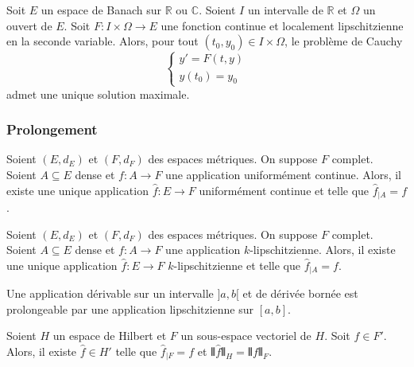 
  \begin{application}
    Soit $E$ un espace de Banach sur $\mathbb{R}$ ou $\mathbb{C}$. Soient $I$ un intervalle de $\mathbb{R}$ et $\Omega$ un ouvert de $E$. Soit $F : I \times \Omega \rightarrow E$ une fonction continue et localement lipschitzienne en la seconde variable. Alors, pour tout $(t_0, y_0) \in I \times \Omega$, le problème de Cauchy
    \[ \begin{cases} y'=F(t,y) \\ y(t_0) = y_0 \end{cases} \tag{$C$} \]
    admet une unique solution maximale.
  \end{application}

  \subsubsection{Prolongement}


  \begin{theorem}
    Soient $(E,d_E)$ et $(F,d_F)$ des espaces métriques. On suppose $F$ complet. Soient $A \subseteq E$ dense et $f : A \rightarrow F$ une application uniformément continue. Alors, il existe une unique application $\widehat{f} : E \rightarrow F$ uniformément continue et telle que $\widehat{f}_{|A} = f$.
  \end{theorem}

  \begin{corollary}
    Soient $(E,d_E)$ et $(F,d_F)$ des espaces métriques. On suppose $F$ complet. Soient $A \subseteq E$ dense et $f : A \rightarrow F$ une application $k$-lipschitzienne. Alors, il existe une unique application $\widehat{f} : E \rightarrow F$ $k$-lipschitzienne et telle que $\widehat{f}_{|A} = f$.
  \end{corollary}

  \begin{example}
    Une application dérivable sur un intervalle $]a,b[$ et de dérivée bornée est prolongeable par une application lipschitzienne sur $[a,b]$.
  \end{example}


  \begin{application}
    Soient $H$ un espace de Hilbert et $F$ un sous-espace vectoriel de $H$. Soit $f \in F'$. Alors, il existe $\widehat{f} \in H'$ telle que $\widehat{f}_{|F} = f$ et $\VERT \widehat{f} \VERT_{H} = \VERT f \VERT_{F}$.
  \end{application}


